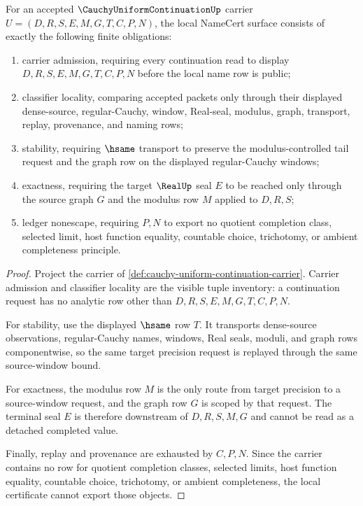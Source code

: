 \begin{theorem}
\label{thm:cauchy-uniform-continuation-namecert-obligations}
For an accepted $\CauchyUniformContinuationUp$ carrier $U=(D,R,S,E,M,G,T,C,P,N)$, the local NameCert surface consists of exactly the following finite obligations:
\begin{enumerate}
\item carrier admission, requiring every continuation read to display $D,R,S,E,M,G,T,C,P,N$ before the local name row is public;
\item classifier locality, comparing accepted packets only through their displayed dense-source, regular-Cauchy, window, Real-seal, modulus, graph, transport, replay, provenance, and naming rows;
\item stability, requiring $\hsame$ transport to preserve the modulus-controlled tail request and the graph row on the displayed regular-Cauchy windows;
\item exactness, requiring the target $\RealUp$ seal $E$ to be reached only through the source graph $G$ and the modulus row $M$ applied to $D,R,S$;
\item ledger nonescape, requiring $P,N$ to export no quotient completion class, selected limit, host function equality, countable choice, trichotomy, or ambient completeness principle.
\end{enumerate}
\end{theorem}
\begin{proof}
Project the carrier of \autoref{def:cauchy-uniform-continuation-carrier}. Carrier admission and classifier locality are the visible tuple inventory: a continuation request has no analytic row other than $D,R,S,E,M,G,T,C,P,N$.

For stability, use the displayed $\hsame$ row $T$. It transports dense-source observations, regular-Cauchy names, windows, Real seals, moduli, and graph rows componentwise, so the same target precision request is replayed through the same source-window bound.

For exactness, the modulus row $M$ is the only route from target precision to a source-window request, and the graph row $G$ is scoped by that request. The terminal seal $E$ is therefore downstream of $D,R,S,M,G$ and cannot be read as a detached completed value.

Finally, replay and provenance are exhausted by $C,P,N$. Since the carrier contains no row for quotient completion classes, selected limits, host function equality, countable choice, trichotomy, or ambient completeness, the local certificate cannot export those objects.
\end{proof}

